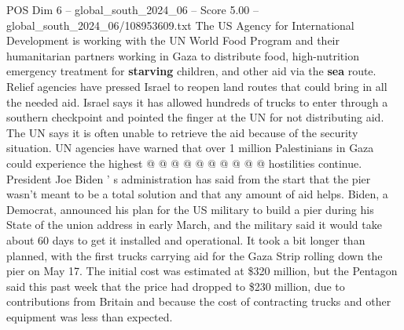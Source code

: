 \begin{textsample}{POS Dim 6 – global\_south\_2024\_06 – Score 5.00 – global\_south\_2024\_06/108953609.txt}
The US Agency for International Development is working with the UN World Food Program and their humanitarian partners working in Gaza to distribute food, high-nutrition emergency treatment for \textbf{starving} children, and other aid via the \textbf{sea} route.
Relief agencies have pressed Israel to reopen land routes that could bring in all the needed aid.
Israel says it has allowed hundreds of trucks to enter through a southern checkpoint and pointed the finger at the UN for not distributing aid.
The UN says it is often unable to retrieve the aid because of the security situation.
UN agencies have warned that over 1 million Palestinians in Gaza could experience the highest @ @ @ @ @ @ @ @ @ @ hostilities continue.
President Joe Biden ' s administration has said from the start that the pier wasn't meant to be a total solution and that any amount of aid helps.
Biden, a Democrat, announced his plan for the US military to build a pier during his State of the union address in early March, and the military said it would take about 60 days to get it installed and operational.
It took a bit longer than planned, with the first trucks carrying aid for the Gaza Strip rolling down the pier on May 17.
The initial cost was estimated at \$320 million, but the Pentagon said this past week that the price had dropped to \$230 million, due to contributions from Britain and because the cost of contracting trucks and other equipment was less than expected.

\end{textsample}
